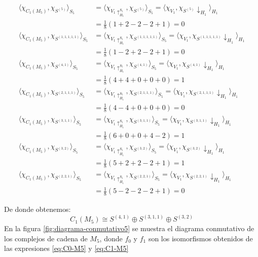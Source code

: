 \documentclass[12pt]{book}
\theoremstyle{definition}
\newcounter{in}
\begin{document}
{\scriptsize
  \begin{align*}
    \langle\chi_{C_{1}(M_{5})},\chi_{S^{(5)}}\rangle_{S_{5}}&=\langle\chi_{V_{1}\uparrow^{S_{5}}_{H_1}},\chi_{S^{(5)}}\rangle_{S_{5}}=\langle\chi_{V_{1}},\chi_{S^{(5)}}\downarrow_{H_{1}}\rangle_{H_{1}}\\
    &=\frac{1}{8}(1+2-2-2+1)=0\\
    \langle\chi_{C_{1}(M_{5})},\chi_{S^{(1,1,1,1,1)}}\rangle_{S_{5}}&=\langle\chi_{V_{1}\uparrow^{S_{5}}_{H_1}},\chi_{S^{(1,1,1,1,1)}}\rangle_{S_{5}}=\langle\chi_{V_{1}},\chi_{S^{(1,1,1,1,1)}}\downarrow_{H_{1}}\rangle_{H_{1}}\\
    &=\frac{1}{8}(1-2+2-2+1)=0 \\
    \langle\chi_{C_{1}(M_{5})},\chi_{S^{(4,1)}}\rangle_{S_{5}}&=\langle\chi_{V_{1}\uparrow^{S_{5}}_{H_1}},\chi_{S^{(4,1)}}\rangle_{S_{5}}=\langle\chi_{V_{1}},\chi_{S^{(4,1)}}\downarrow_{H_{1}}\rangle_{H_{1}}\\
    &=\frac{1}{8}(4+4+0+0+0)=1 \\
    \langle\chi_{C_{1}(M_{5})},\chi_{S^{(2,1,1,1)}}\rangle_{S_{5}}&=\langle\chi_{V_{1}\uparrow^{S_{5}}_{H_1}},\chi_{S^{(2,1,1,1)}}\rangle_{S_{5}}=\langle\chi_{V_{1}},\chi_{S^{(2,1,1,1)}}\downarrow_{H_{1}}\rangle_{H_{1}}\\
    &=\frac{1}{8}(4-4+0+0+0)=0 \\
    \langle\chi_{C_{1}(M_{5})},\chi_{S^{(3,1,1)}}\rangle_{S_{5}}&=\langle\chi_{V_{1}\uparrow^{S_{5}}_{H_1}},\chi_{S^{(3,1,1)}}\rangle_{S_{5}}=\langle\chi_{V_{1}},\chi_{S^{(3,1,1)}}\downarrow_{H_{1}}\rangle_{H_{1}}\\
    &=\frac{1}{8}(6+0+0+4-2)=1 \\
    \langle\chi_{C_{1}(M_{5})},\chi_{S^{(3,2)}}\rangle_{S_{5}}&=\langle\chi_{V_{1}\uparrow^{S_{5}}_{H_1}},\chi_{S^{(3,2)}}\rangle_{S_{5}}=\langle\chi_{V_{1}},\chi_{S^{(3,2)}}\downarrow_{H_{1}}\rangle_{H_{1}}\\
    &=\frac{1}{8}(5+2+2-2+1)=1 \\
    \langle\chi_{C_{1}(M_{5})},\chi_{S^{(2,2,1)}}\rangle_{S_{5}}&=\langle\chi_{V_{1}\uparrow^{S_{5}}_{H_1}},\chi_{S^{(2,2,1)}}\rangle_{S_{5}}=\langle\chi_{V_{1}},\chi_{S^{(2,2,1)}}\downarrow_{H_{1}}\rangle_{H_{1}}\\
    &=\frac{1}{8}(5-2-2-2+1)=0
  \end{align*}}

De donde obtenemos:
\begin{equation}
  \label{eq:C1-M5}
  C_{1}(M_{5})\cong S^{(4,1)}\oplus S^{(3,1,1)}\oplus S^{(3,2)}
\end{equation}
En la figura \ref{fig:diagrama-conmutativo5} se muestra el diagrama
conmutativo de los complejos de cadena de $M_{5}$, donde $f_{0}$ y
$f_{1}$ son los isomorfismos obtenidos de las expresiones
\ref{eq:C0-M5} y \ref{eq:C1-M5}
\end{document}
